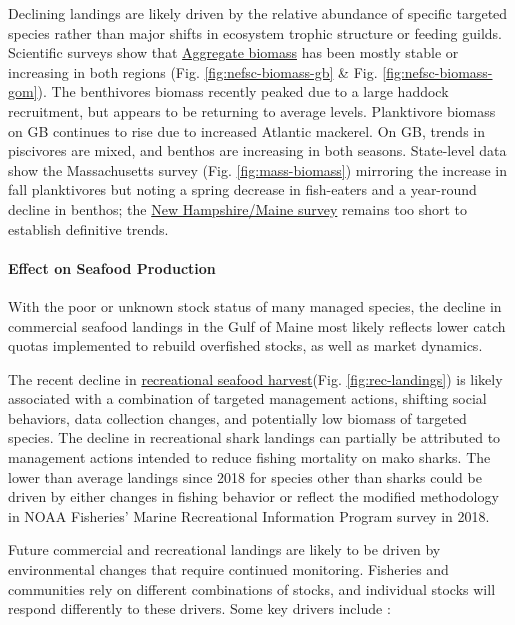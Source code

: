 \documentclass[
  10pt,
]{article}
\begin{document}
Declining landings are likely driven by the relative abundance of specific targeted species rather than major shifts in ecosystem trophic structure or feeding guilds. Scientific surveys show that \href{https://noaa-edab.github.io/catalog/aggregate_biomass.html}{Aggregate biomass} has been mostly stable or increasing in both regions (Fig. \ref{fig:nefsc-biomass-gb} \& Fig. \ref{fig:nefsc-biomass-gom}). The benthivores biomass recently peaked due to a large haddock recruitment, but appears to be returning to average levels. Planktivore biomass on GB continues to rise due to increased Atlantic mackerel. On GB, trends in piscivores are mixed, and benthos are increasing in both seasons. State-level data show the Massachusetts survey (Fig. \ref{fig:mass-biomass}) mirroring the increase in fall planktivores but noting a spring decrease in fish-eaters and a year-round decline in benthos; the \href{https://noaa-edab.github.io/catalog/mass_inshore_survey.html?q=survey\#mass_inshore_survey}{New Hampshire/Maine survey} remains too short to establish definitive trends.

\paragraph{Effect on Seafood Production}\label{effect-on-seafood-production-1}

With the poor or unknown stock status of many managed species, the decline in commercial seafood landings in the Gulf of Maine most likely reflects lower catch quotas implemented to rebuild overfished stocks, as well as market dynamics.

The recent decline in \href{https://noaa-edab.github.io/catalog/recdat.html}{recreational seafood harvest}(Fig. \ref{fig:rec-landings}) is likely associated with a combination of targeted management actions, shifting social behaviors, data collection changes, and potentially low biomass of targeted species. The decline in recreational shark landings can partially be attributed to management actions intended to reduce fishing mortality on mako sharks. The lower than average landings since 2018 for species other than sharks could be driven by either changes in fishing behavior or reflect the modified methodology in NOAA Fisheries' Marine Recreational Information Program survey in 2018.

Future commercial and recreational landings are likely to be driven by environmental changes that require continued monitoring. Fisheries and communities rely on different combinations of stocks, and individual stocks will respond differently to these drivers. Some key drivers include :
\end{document}
